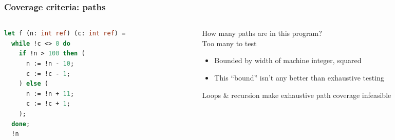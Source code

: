\documentclass[10pt,xcolor={dvipsnames}]{beamer}
\begin{document}

\begin{frame}[fragile]

\frametitle{Coverage criteria: paths}

\begin{columns}

\begin{column}{0.55\textwidth}
\begin{lstlisting}[language=Caml]
let f (n: int ref) (c: int ref) =   
  while !c <> 0 do
    if !n > 100 then (
      n := !n - 10;
      c := !c - 1;
    ) else (
      n := !n + 11;
      c := !c + 1;
    );    
  done;
  !n
\end{lstlisting}
\end{column}

\begin{column}{0.45\textwidth}
How many paths are in this program?
\\[1em]

Too many to test
\begin{itemize}
\item<3-> Bounded by width of machine integer, squared \\[0.5em]
\item<4-> This ``bound'' isn't any better than exhaustive testing \\[1.5em]
\end{itemize}

Loops \& recursion make exhaustive path coverage infeasible
\end{column}


\end{columns}

\end{frame}




\end{document}
